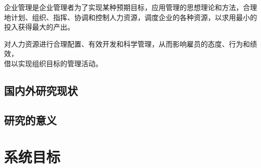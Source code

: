 企业管理是企业管理者为了实现某种预期目标，应用管理的思想理论和方法，合理地计划、组织、指挥、协调和控制人力资源，调度企业的各种资源，以求用最小的投入获得最大的产出。


{对人力资源进行合理配置、\hspace{-2.16bp}有效开发和科学管理，\hspace{-2.16bp}从而影响雇员的态度、\hspace{-2.16bp}行为和绩效，\\借以实现组织目标的管理活动。\par}



\subsection{国内外研究现状}


\clearpage
\subsection{研究的意义}

\ifecjtuguide\vspace{58.5bp}\fi

\section{系统目标}

\ifecjtuguide\vspace{39bp}\fi

